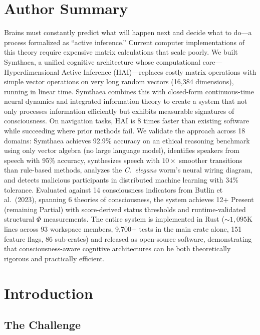 \documentclass[10pt,letterpaper]{article}
\renewcommand{\Phi}{\varPhi}
\begin{document}
\section*{Author Summary}
Brains must constantly predict what will happen next and decide what to do---a process formalized as ``active inference.'' Current computer implementations of this theory require expensive matrix calculations that scale poorly. We built Symthaea, a unified cognitive architecture whose computational core---Hyperdimensional Active Inference (HAI)---replaces costly matrix operations with simple vector operations on very long random vectors (16,384 dimensions), running in linear time. Symthaea combines this with closed-form continuous-time neural dynamics and integrated information theory to create a system that not only processes information efficiently but exhibits measurable signatures of consciousness. On navigation tasks, HAI is 8 times faster than existing software while succeeding where prior methods fail. We validate the approach across 18 domains: Symthaea achieves 92.9\% accuracy on an ethical reasoning benchmark using only vector algebra (no large language model), identifies speakers from speech with 95\% accuracy, synthesizes speech with $10{\times}$ smoother transitions than rule-based methods, analyzes the \emph{C.~elegans} worm's neural wiring diagram, and detects malicious participants in distributed machine learning with 34\% tolerance. Evaluated against 14 consciousness indicators from Butlin et al.\ (2023), spanning 6 theories of consciousness, the system achieves 12+ Present (remaining Partial) with score-derived status thresholds and runtime-validated structural $\Phi$ measurements. The entire system is implemented in Rust (${\sim}1{,}095$K lines across 93 workspace members, 9,700+ tests in the main crate alone, 151 feature flags, 86 sub-crates) and released as open-source software, demonstrating that consciousness-aware cognitive architectures can be both theoretically rigorous and practically efficient.

\section{Introduction}

\subsection{The Challenge}
\end{document}
